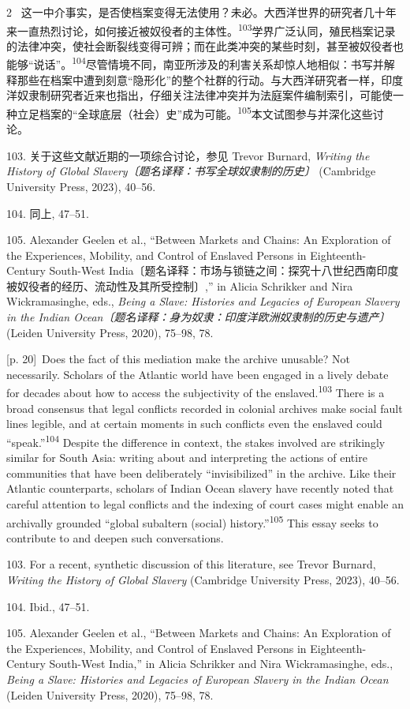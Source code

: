 \documentclass[10pt,a4paper]{article}
\begin{document}
\begin{paracol}{2}
\switchcolumn*
{\scriptsize\color{gray} [p. 20]}\ 这一中介事实，是否使档案变得无法使用？未必。大西洋世界的研究者几十年来一直热烈讨论，如何接近被奴役者的主体\mbox{性。\textsuperscript{103}}学界广泛认同，殖民档案记录的法律冲突，使社会断裂线变得可辨；而在此类冲突的某些时刻，甚至被奴役者也能够“说话”。\nobreak\textsuperscript{104}尽管情境不同，南亚所涉及的利害关系却惊人地相似：书写并解释那些在档案中遭到刻意“隐形化”的整个社群的行动。与大西洋研究者一样，印度洋奴隶制研究者近来也指出，仔细关注法律冲突并为法庭案件编制索引，可能使一种立足档案的“全球底层（社会）史”成为可\mbox{能。\textsuperscript{105}}本文试图参与并深化这些讨论。\par{\small 103. 关于这些文献近期的一项综合讨论，参见 Trevor Burnard, \textit{Writing the History of Global Slavery〔题名译释：书写全球奴隶制的历史〕} (Cambridge University Press, 2023), 40–56.\par}{\small 104. 同上, 47–51.\par}{\small 105. Alexander Geelen et al., “Between Markets and Chains: An Exploration of the Experiences, Mobility, and Control of Enslaved Persons in Eighteenth-Century South-West India〔题名译释：市场与锁链之间：探究十八世纪西南印度被奴役者的经历、流动性及其所受控制〕,” in Alicia Schrikker and Nira Wickramasinghe, eds., \textit{Being a Slave: Histories and Legacies of European Slavery in the Indian Ocean〔题名译释：身为奴隶：印度洋欧洲奴隶制的历史与遗产〕} (Leiden University Press, 2020), 75–98, 78.\par}
\switchcolumn
{\scriptsize\color{gray} [p. 20]}\ Does the fact of this mediation make the archive unusable? Not necessarily. Scholars of the Atlantic world have been engaged in a lively debate for decades about how to access the subjectivity of the enslaved.\nobreak\textsuperscript{103} There is a broad consensus that legal conflicts recorded in colonial archives make social fault lines legible, and at certain moments in such conflicts even the enslaved could “speak.”\nobreak\textsuperscript{104} Despite the difference in context, the stakes involved are strikingly similar for South Asia: writing about and interpreting the actions of entire communities that have been deliberately “invisibilized” in the archive. Like their Atlantic counterparts, scholars of Indian Ocean slavery have recently noted that careful attention to legal conflicts and the indexing of court cases might enable an archivally grounded “global subaltern (social) history.”\nobreak\textsuperscript{105} This essay seeks to contribute to and deepen such conversations.\par{\small 103. For a recent, synthetic discussion of this literature, see Trevor Burnard, \textit{Writing the History of Global Slavery} (Cambridge University Press, 2023), 40–56.\par}{\small 104. Ibid., 47–51.\par}{\small 105. Alexander Geelen et al., “Between Markets and Chains: An Exploration of the Experiences, Mobility, and Control of Enslaved Persons in Eighteenth-Century South-West India,” in Alicia Schrikker and Nira Wickramasinghe, eds., \textit{Being a Slave: Histories and Legacies of European Slavery in the Indian Ocean} (Leiden University Press, 2020), 75–98, 78.\par}

\end{paracol}
\end{document}
